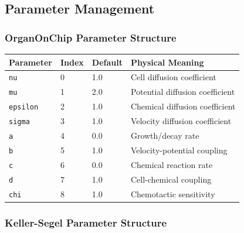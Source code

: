 \subsection{Parameter Management}
\label{subsec:parameter_management}

\subsubsection{OrganOnChip Parameter Structure}

\begin{longtable}{|p{3cm}|p{2cm}|p{2cm}|p{6cm}|}
\hline
\textbf{Parameter} & \textbf{Index} & \textbf{Default} & \textbf{Physical Meaning} \\
\hline
\endhead

\texttt{nu} & 0 & 1.0 & Cell diffusion coefficient \\
\hline

\texttt{mu} & 1 & 2.0 & Potential diffusion coefficient \\
\hline

\texttt{epsilon} & 2 & 1.0 & Chemical diffusion coefficient \\
\hline

\texttt{sigma} & 3 & 1.0 & Velocity diffusion coefficient \\
\hline

\texttt{a} & 4 & 0.0 & Growth/decay rate \\
\hline

\texttt{b} & 5 & 1.0 & Velocity-potential coupling \\
\hline

\texttt{c} & 6 & 0.0 & Chemical reaction rate \\
\hline

\texttt{d} & 7 & 1.0 & Cell-chemical coupling \\
\hline

\texttt{chi} & 8 & 1.0 & Chemotactic sensitivity \\
\hline

\end{longtable}

\subsubsection{Keller-Segel Parameter Structure}

